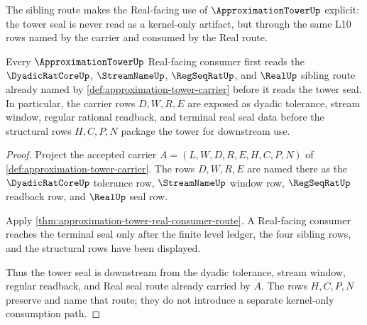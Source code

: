 The sibling route makes the Real-facing use of $\ApproximationTowerUp$ explicit: the tower seal is never read as a kernel-only artifact, but through the same L10 rows named by the carrier and consumed by the Real route.

\begin{theorem}
\label{thm:approximation-tower-sibling-route}
Every $\ApproximationTowerUp$ Real-facing consumer first reads the $\DyadicRatCoreUp$, $\StreamNameUp$, $\RegSeqRatUp$, and $\RealUp$ sibling route already named by \autoref{def:approximation-tower-carrier} before it reads the tower seal. In particular, the carrier rows $D,W,R,E$ are exposed as dyadic tolerance, stream window, regular rational readback, and terminal real seal data before the structural rows $H,C,P,N$ package the tower for downstream use.
\end{theorem}
\begin{proof}
Project the accepted carrier $A=(L,W,D,R,E,H,C,P,N)$ of \autoref{def:approximation-tower-carrier}. The rows $D,W,R,E$ are named there as the $\DyadicRatCoreUp$ tolerance row, $\StreamNameUp$ window row, $\RegSeqRatUp$ readback row, and $\RealUp$ seal row.

Apply \autoref{thm:approximation-tower-real-consumer-route}. A Real-facing consumer reaches the terminal seal only after the finite level ledger, the four sibling rows, and the structural rows have been displayed.

Thus the tower seal is downstream from the dyadic tolerance, stream window, regular readback, and Real seal route already carried by $A$. The rows $H,C,P,N$ preserve and name that route; they do not introduce a separate kernel-only consumption path.
\end{proof}
